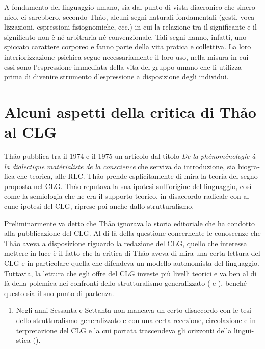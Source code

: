 \documentclass[italian,output=paper,colorlinks,citecolor=brown]{../langscibook}
\begin{document}
\begin{otherlanguage}{italian}
A fondamento del linguaggio umano, sia dal punto di vista diacronico che sincronico, ci sarebbero, secondo Thảo, alcuni segni naturali fondamentali (gesti, vocalizzazioni, espressioni fisiognomiche, ecc.) in cui la relazione tra il significante e il significato non è né arbitraria né convenzionale. Tali segni hanno, infatti, uno spiccato carattere corporeo e fanno parte della vita pratica e collettiva. La loro interiorizzazione psichica segue necessariamente il loro uso, nella misura in cui essi sono l’espressione immediata della vita del gruppo umano che li utilizza prima di divenire strumento d’espressione a disposizione degli individui.

\section{Alcuni aspetti della critica di Thảo al CLG}

Thảo pubblica tra il 1974 e il 1975 un articolo dal titolo \textit{De} \textit{la} \textit{phénoménologie} \textit{à} \textit{la} \textit{dialectique} \textit{matérialiste} \textit{de} \textit{la} \textit{conscience} che serviva da introduzione, sia biografica che teorica, alle RLC. Th\textlatin{ả}o prende esplicitamente di mira la teoria del segno proposta nel CLG. Th\textlatin{ả}o reputava la sua ipotesi sull’origine del linguaggio, così come la semiologia che ne era il supporto teorico, in disaccordo radicale con alcune ipotesi del CLG, riprese poi anche dallo strutturalismo.

Preliminarmente va detto che Th\textlatin{ả}o ignorava la storia editoriale che ha condotto alla pubblicazione del CLG. Al di là della questione concernente le conoscenze che Th\textlatin{ả}o aveva a disposizione riguardo la redazione del CLG, quello che interessa mettere in luce è il fatto che la critica di Th\textlatin{ả}o aveva di mira una certa lettura del CLG e in particolare quella che difendeva un modello autonomista del linguaggio. Tuttavia, la lettura che egli offre del CLG investe più livelli teorici e va ben al di là della polemica nei confronti dello strutturalismo generalizzato (\citealt{ChissEtAl2015} e \citealt{Léon2013}), benché questo sia il suo punto di partenza.

\begin{enumerate}
\renewcommand{\labelenumi}{{\alph{enumi}})}

\item Negli anni Sessanta e Settanta non mancava un certo disaccordo con le tesi dello strutturalismo generalizzato e con una certa recezione, circolazione e interpretazione del CLG e la cui portata trascendeva gli orizzonti della linguistica (\citealt{Dosse1991, Dosse1992, Puech2013Saussure, Puech2013Structuralism, Lepschy1966}).


\end{enumerate}
\end{otherlanguage}
\end{document}
